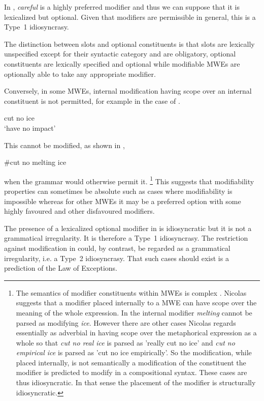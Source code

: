\documentclass[output=paper]{langsci/langscibook}
\begin{document}
In , \textit{careful} is a highly preferred modifier and thus we can suppose that it is lexicalized but optional. Given that modifiers are permissible in general, this is a Type~1 idiosyncrasy.

The distinction between slots and optional constituents is that slots are lexically unspecified except for their syntactic category and are obligatory, optional constituents are lexically specified and optional while modifiable MWEs are optionally able to take any appropriate modifier.

Conversely, in some MWEs, internal modification having scope over an internal constituent is not permitted, for example in the case of .

\begin{exe}
\ex\label{ex:ex36} cut no ice\\
‘have no impact’
\end{exe}



This cannot be modified, as shown in ,

\begin{exe}
\ex\label{ex:ex37} \#cut no melting ice
\end{exe}

\noindent
when the grammar would otherwise permit it.%
\footnote{   The semantics of modifier constituents within MWEs is complex \citep{Nicolas1995}. Nicolas suggests that a modifier 
placed internally to a MWE can have scope over the meaning of the whole 
expression. In  the internal modifier \textit{melting} 
cannot be parsed as modifying \textit{ice}. However there are other cases 
Nicolas regards essentially as adverbial in having scope over the 
metaphorical expression as a whole so that \textit{cut no real ice} is 
parsed as  'really cut no ice' and \textit{cut no empirical ice} is parsed 
as\textit{} 'cut no ice empirically'. So the modification, while placed 
internally, is not semantically a modification of the constituent the 
modifier is predicted to modify in a compositional syntax. These cases are 
thus idiosyncratic. In that sense the placement of the modifier is 
structurally idiosyncratic.} 
This suggests that modifiability properties 
can sometimes be absolute such as cases where modifiability is impossible 
whereas for other MWEs it may be a preferred option with some highly 
favoured and other disfavoured modifiers. 

The presence of a lexicalized optional modifier in  is idiosyncratic but it is not a grammatical irregularity. It is therefore a Type~1 idiosyncrasy. The restriction against modification in  could, by contrast, be regarded as a grammatical irregularity, i.e. a Type~2 idiosyncrasy. That such cases should exist is a prediction of the Law of Exceptions. 
\end{document}
